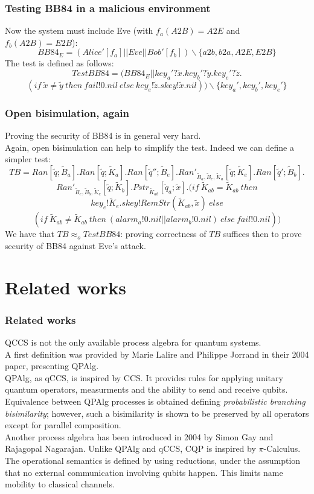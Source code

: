 \documentclass{beamer}
\begin{document}
\begin{frame}
\frametitle{Testing BB84 in a malicious environment}
Now the system must include Eve (with $f_a (A2B) = A2E$ and $f_b (A2B) = E2B$):
\[ BB84_E = ( Alice'[f_a] \lvert \rvert Eve \lvert \rvert Bob'[f_b] ) \backslash \{a2b, b2a, A2E, E2B \}\]
The test is defined as follows:
\[ TestBB84 = (BB84_E \lvert \rvert key_a'?\widetilde{x}.key_b'?\widetilde{y}.key_e'?\widetilde{z}.\]
\[(if \ \widetilde{x} \not = \widetilde{y} \ then \ fail!0.nil \ else \ key_e!\widetilde{z}.skey!\widetilde{x}.nil)) \backslash \{key_a', key_b', key_e'\}\]
\end{frame}

\begin{frame}
\frametitle{Open bisimulation, again}
Proving the security of BB84 is in general very hard. \\
Again, open bisimulation can help to simplify the test. Indeed we can define a simpler test:
\[ TB = Ran[\widetilde{q};\widetilde{B}_a].Ran[\widetilde{q};\widetilde{K}_a].Ran[\widetilde{q}'';\widetilde{B}_e].Ran'_{\widetilde{B}_a,\widetilde{B}_e,\widetilde{K}_a}[\widetilde{q};\widetilde{K}_e].Ran[\widetilde{q}';\widetilde{B}_b].\]
\[ Ran'_{\widetilde{B}_e,\widetilde{B}_b,\widetilde{K}_e}[\widetilde{q};\widetilde{K}_b].Pstr_{\widetilde{K}_{ab}}[\widetilde{q}_a;\widetilde{x}].(if \ \widetilde{K}_{ab} = \widetilde{K}_{ab} \ then \]
\[ key_e!\widetilde{K}_e.skey!RemStr(\widetilde{K}_{ab},\widetilde{x}) \ else \]
\[ (if \ \widetilde{K}_{ab} \not = \widetilde{K}_{ab} \ then \ (alarm_a!0.nil \lvert \rvert alarm_b!0.nil) \ else \ fail!0.nil)) \]
We have that $TB \approx_o TestBB84$: proving correctness of $TB$ suffices then to prove security of BB84 against Eve's attack.
\end{frame}

\section{Related works}

\begin{frame}
\frametitle{Related works}
QCCS is not the only available process algebra for quantum systems. \\
\smallskip
A first definition was provided by Marie Lalire and Philippe Jorrand in their 2004 paper, presenting QPAlg. \\
QPAlg, as qCCS, is inspired by CCS. It provides rules for applying unitary quantum operators, measurments and the ability to send and receive qubits. Equivalence between QPAlg processes is obtained defining \emph{probabilistic branching bisimilarity}; however, such a bisimilarity is shown to be preserved by all operators except for parallel composition. \\ \smallskip
Another process algebra has been introduced in 2004 by Simon Gay and Rajagopal Nagarajan.
Unlike QPAlg and qCCS, CQP is inspired by $\pi$-Calculus. The operational semantics is defined by using reductions, under the assumption that no external communication involving qubits happen. This limits name mobility to classical channels.
\end{frame}
\end{document}
